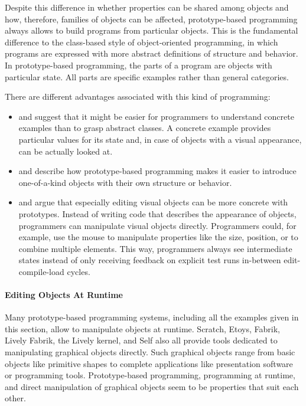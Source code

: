 Despite this difference in whether properties can be shared among objects and how, therefore, families of objects can be affected, prototype-based programming always allows to build programs from particular objects.
This is the fundamental difference to the class-based style of object-oriented programming, in which programs are expressed with more abstract definitions of structure and behavior.
In prototype-based programming, the parts of a program are objects with particular state.
All parts are specific examples rather than general categories.

There are different advantages associated with this kind of programming:
\begin{itemize}
    \item \cite{Taivalsaari1996CVP} and \cite{Ungar1987SPS} suggest that it might be easier for programmers to understand concrete examples than to grasp abstract classes. A concrete example provides particular values for its state and, in case of objects with a visual appearance, can be actually looked at.
    \item \cite{Ungar1987SPS} and \cite{Borning1986CVP} describe how prototype-based programming makes it easier to introduce one-of-a-kind objects with their own structure or behavior.
    \item \cite{Borning1986CVP} and \cite{Maloney1995Mor} argue that especially editing visual objects can be more concrete with prototypes. Instead of writing code that describes the appearance of objects, programmers can manipulate visual objects directly. Programmers could, for example, use the mouse to manipulate properties like the size, position, or to combine multiple elements. This way, programmers always see intermediate states instead of only receiving feedback on explicit test runs in-between edit-compile-load cycles. 
\end{itemize}

\paragraph{Editing Objects At Runtime}
Many prototype-based programming systems, including all the examples given in this section, allow to manipulate objects at runtime.
Scratch, Etoys, Fabrik, Lively Fabrik, the Lively kernel, and Self also all provide tools dedicated to manipulating graphical objects directly.
Such graphical objects range from basic objects like primitive shapes to complete applications like presentation software or programming tools.
Prototype-based programming, programming at runtime, and direct manipulation of graphical objects seem to be properties that suit each other.


